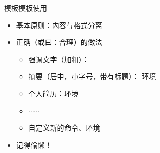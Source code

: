 \documentclass[fontset = adobe, xcolor=svgnames, t, aspectratio=169]{ctexbeamer}
\begin{document}
\begin{frame}[t]{\nwafuthesis 模板}{模板使用}
  \stretchon
  \begin{itemize}
  \item 基本原则：\alert{内容与格式分离}
  \item 正确（或曰：合理）的做法

    \begin{itemize}
      \item 强调文字（加粗）：
      \item 摘要（居中，小字号，带有标题）： 环境
      \item 个人简历：环境
      \item $\cdots\cdots$  
      \item 自定义新的命令、环境
    \end{itemize}

  \item 记得\alert{偷懒！}
    
  \end{itemize}
  \stretchoff
\end{frame}
\end{document}

